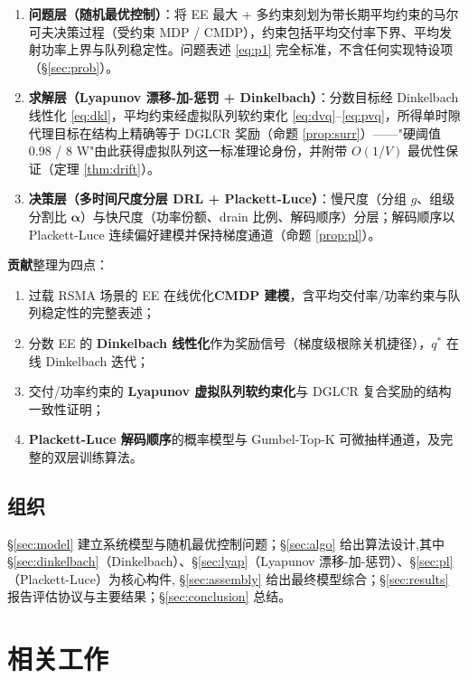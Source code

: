 \documentclass[UTF8,11pt,a4paper]{ctexart}
\theoremstyle{plain}
\theoremstyle{definition}
\theoremstyle{remark}
\newcommand{\vect}[1]{\mathbf{#1}}
\begin{document}
\begin{enumerate}
\item \textbf{问题层（随机最优控制）}：将 EE 最大 + 多约束刻划为带长期平均约束的马尔可夫决策过程（受约束 MDP / CMDP），约束包括平均交付率下界、平均发射功率上界与队列稳定性。问题表述 \eqref{eq:p1} 完全标准，不含任何实现特设项（\S\ref{sec:prob}）。
\item \textbf{求解层（Lyapunov 漂移-加-惩罚 + Dinkelbach）}：分数目标经 Dinkelbach 线性化 \eqref{eq:dkl}，平均约束经虚拟队列软约束化 \eqref{eq:dvq}--\eqref{eq:pvq}，所得单时隙代理目标在结构上精确等于 DGLCR 奖励（命题 \ref{prop:surr}）——"硬阈值 0.98 / 8 W"由此获得虚拟队列这一标准理论身份，并附带 $O(1/V)$ 最优性保证（定理 \ref{thm:drift}）。
\item \textbf{决策层（多时间尺度分层 DRL + Plackett-Luce）}：慢尺度（分组 $g$、组级分割比 $\vect\alpha$）与快尺度（功率份额、drain 比例、解码顺序）分层；解码顺序以 Plackett-Luce 连续偏好建模并保持梯度通道（命题 \ref{prop:pl}）。
\end{enumerate}

\noindent\textbf{贡献}整理为四点：
\begin{enumerate}
\item 过载 RSMA 场景的 EE 在线优化\textbf{CMDP 建模}，含平均交付率/功率约束与队列稳定性的完整表述；
\item 分数 EE 的 \textbf{Dinkelbach 线性化}作为奖励信号（梯度级根除关机捷径），$q^*$ 在线 Dinkelbach 迭代；
\item 交付/功率约束的 \textbf{Lyapunov 虚拟队列软约束化}与 DGLCR 复合奖励的结构一致性证明；
\item \textbf{Plackett-Luce 解码顺序}的概率模型与 Gumbel-Top-K 可微抽样通道，及完整的双层训练算法。
\end{enumerate}

\subsection{组织}

\S\ref{sec:model} 建立系统模型与随机最优控制问题；\S\ref{sec:algo} 给出算法设计,其中 \S\ref{sec:dinkelbach}（Dinkelbach）、\S\ref{sec:lyap}（Lyapunov 漂移-加-惩罚）、\S\ref{sec:pl}（Plackett-Luce）为核心构件, \S\ref{sec:assembly} 给出最终模型综合；\S\ref{sec:results} 报告评估协议与主要结果；\S\ref{sec:conclusion} 总结。

\section{相关工作} \label{sec:related}
\end{document}
